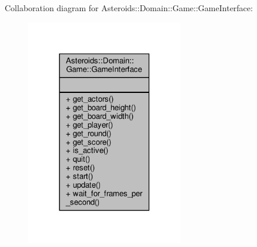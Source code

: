 Collaboration diagram for Asteroids\+:\+:Domain\+:\+:Game\+:\+:Game\+Interface\+:\nopagebreak
\begin{figure}[H]
\begin{center}
\leavevmode
\includegraphics[width=194pt]{classAsteroids_1_1Domain_1_1Game_1_1GameInterface__coll__graph}
\end{center}
\end{figure}
